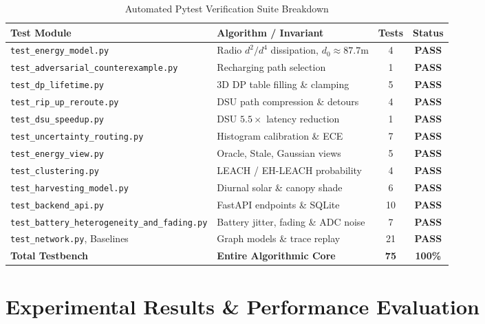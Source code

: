 \documentclass[journal]{IEEEtran}
\begin{document}
\begin{table}[!t]
\caption{Automated Pytest Verification Suite Breakdown}
\label{tab:pytest}
\centering
\begin{tabular}{@{}llcc@{}}
\toprule
\textbf{Test Module} & \textbf{Algorithm / Invariant} & \textbf{Tests} & \textbf{Status} \\
\midrule
\texttt{test\_energy\_model.py} & Radio $d^2/d^4$ dissipation, $d_0 \approx 87.7\text{m}$ & 4 & \textbf{PASS} \\
\texttt{test\_adversarial\_counterexample.py} & Recharging path selection & 1 & \textbf{PASS} \\
\texttt{test\_dp\_lifetime.py} & 3D DP table filling \& clamping & 5 & \textbf{PASS} \\
\texttt{test\_rip\_up\_reroute.py} & DSU path compression \& detours & 4 & \textbf{PASS} \\
\texttt{test\_dsu\_speedup.py} & DSU $5.5\times$ latency reduction & 1 & \textbf{PASS} \\
\texttt{test\_uncertainty\_routing.py} & Histogram calibration \& ECE & 7 & \textbf{PASS} \\
\texttt{test\_energy\_view.py} & Oracle, Stale, Gaussian views & 5 & \textbf{PASS} \\
\texttt{test\_clustering.py} & LEACH / EH-LEACH probability & 4 & \textbf{PASS} \\
\texttt{test\_harvesting\_model.py} & Diurnal solar \& canopy shade & 6 & \textbf{PASS} \\
\texttt{test\_backend\_api.py} & FastAPI endpoints \& SQLite & 10 & \textbf{PASS} \\
\texttt{test\_battery\_heterogeneity\_and\_fading.py} & Battery jitter, fading \& ADC noise & 7 & \textbf{PASS} \\
\texttt{test\_network.py}, Baselines & Graph models \& trace replay & 21 & \textbf{PASS} \\
\midrule
\textbf{Total Testbench} & \textbf{Entire Algorithmic Core} & \textbf{75} & \textbf{100\%} \\
\bottomrule
\end{tabular}
\end{table}

\section{Experimental Results \& Performance Evaluation}
\end{document}

